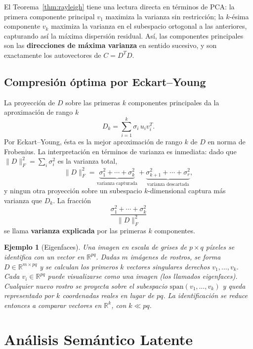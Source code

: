 \documentclass[12pt]{article}
\newtheorem{example}[theorem]{Ejemplo}
\newcommand{\R}{\mathbb{R}}
\begin{document}
El Teorema~\ref{thm:rayleigh} tiene una lectura directa en términos de PCA: la primera componente principal $v_1$ maximiza la varianza sin restricción; la $k$-ésima componente $v_k$ maximiza la varianza en el subespacio ortogonal a las anteriores, capturando así la máxima dispersión residual. Así, las componentes principales son las \textbf{direcciones de máxima varianza} en sentido sucesivo, y son exactamente los autovectores de $C = D^T D$.

\subsection{Compresión óptima por Eckart--Young}

La proyección de $D$ sobre las primeras $k$ componentes principales da la aproximación de rango $k$
\[
  D_k = \sum_{i=1}^k \sigma_i\, u_i v_i^T.
\]
Por Eckart--Young, ésta es la mejor aproximación de rango $k$ de $D$ en norma de Frobenius. La interpretación en términos de varianza es inmediata: dado que $\|D\|_F^2 = \sum_i \sigma_i^2$ es la varianza total,
\[
  \|D\|_F^2 = \underbrace{\sigma_1^2 + \cdots + \sigma_k^2}_{\text{varianza capturada}} + \underbrace{\sigma_{k+1}^2 + \cdots + \sigma_r^2}_{\text{varianza descartada}},
\]
y ningun otra proyección sobre un subespacio $k$-dimensional captura más varianza que $D_k$. La fracción
\[
  \frac{\sigma_1^2 + \cdots + \sigma_k^2}{\|D\|_F^2}
\]
se llama \textbf{varianza explicada} por las primeras $k$ componentes.

\begin{example}[Eigenfaces]
Una imagen en escala de grises de $p \times q$ píxeles se identifica con un vector en $\R^{pq}$. Dadas $m$ imágenes de rostros, se forma $D \in \R^{m \times pq}$ y se calculan los primeros $k$ vectores singulares derechos $v_1, \ldots, v_k$. Cada $v_i \in \R^{pq}$ puede visualizarse como una imagen (los llamados \emph{eigenfaces}). Cualquier nuevo rostro se proyecta sobre el subespacio $\mathrm{span}(v_1,\ldots,v_k)$ y queda representado por $k$ coordenadas reales en lugar de $pq$. La identificación se reduce entonces a comparar vectores en $\R^k$, con $k \ll pq$.
\end{example}

\section{Análisis Semántico Latente}
\end{document}
